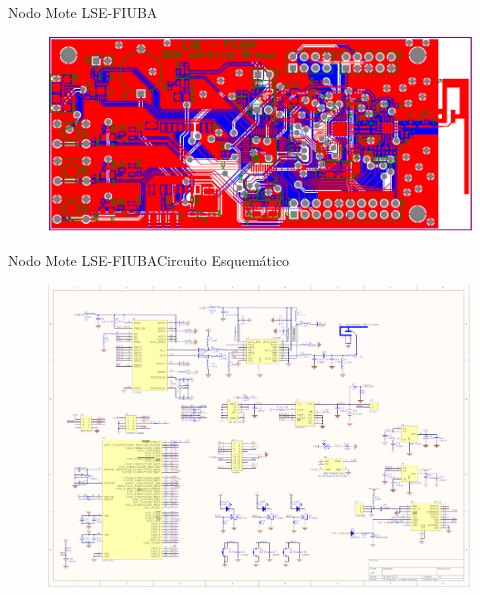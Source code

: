 \documentclass[aspectratio=169, handout]{beamer}
\begin{document}
\begin{frame}{Nodo Mote LSE-FIUBA}
\begin{minipage}[c]{1.0\linewidth}
\begin{minipage}[c]{0.35\linewidth}
\begin{figure}[H]
			\includegraphics[width=1\textwidth]{./imagenes/motePCB}
			\label{Mote LSE}
		\end{figure}	  	  	
	\end{minipage}
\end{minipage}
\end{frame}


\begin{frame}{Nodo Mote LSE-FIUBA}{Circuito Esquemático}
	\begin{figure}[H]
		\includegraphics[height=.95\textheight]{./imagenes/moteSchema}
	\end{figure}	  	  	
\end{frame}



\end{document}
